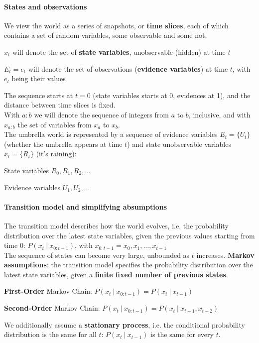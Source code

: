 \documentclass[10pt]{report}
\begin{document}
\paragraph{States and observations} We view the world as a series of snapshots, or \textbf{time slices}, each of which contains a set of random variables, some observable and some not.
\begin{list}{}{}
	\item $x_t$ will denote the set of \textbf{state variables}, unobservable (hidden) at time $t$
	\item $E_t = e_t$ will denote the set of observations (\textbf{evidence variables}) at time $t$, with $e_t$ being their values
\end{list}
The sequence starts at $t=0$ (state variables starts at 0, evidences at 1), and the distance between time slices is fixed.\\
With $a:b$ we will denote the sequence of integers from $a$ to $b$, inclusive, and with $x_{a:b}$ the set of variables from $x_a$ to $x_b$.\\
The umbrella world is represented by a sequence of evidence variables $E_t=\{U_t\}$ (whether the umbrella appears at time $t$) and state unobservable variables $x_t=\{R_t\}$ (it's raining):
\begin{list}{}{}
	\item State variables $R_0,R_1,R_2,\ldots$
	\item Evidence variables $U_1,U_2,\ldots$
\end{list}
\paragraph{Transition model and simplifying absumptions} The transition model describes how the world evolves, i.e. the probability distribution over the latest state variables, given the previous values starting from time $0$: $P(x_t\:|\:x_{0:t-1})$, with $x_{0:t-1} = x_0,x_1,\ldots,x_{t-1}$\\
The sequence of states can become very large, unbounded as $t$ increases. \textbf{Markov assumptions}: the transition model specifies the probability distribution over the latest state variables, given a \textbf{finite fixed number of previous states}.
\begin{list}{}{}
	\item \textbf{First-Order} Markov Chain: $P(x_t\:|\:x_{0:t-1}) = P(x_t\:|\:x_{t-1})$
	\item \textbf{Second-Order} Markov Chain: $P(x_t\:|\:x_{0:t-1}) = P(x_t\:|\:x_{t-1}, x_{t-2})$
\end{list}
We additionally assume a \textbf{stationary process}, i.e. the conditional probability distribution is the same for all $t$: $P(x_t\:|\:x_{t-1})$ is the same for every $t$.
\end{document}
